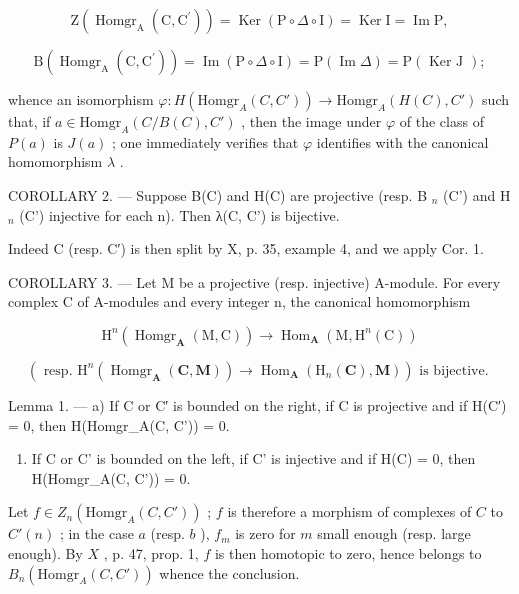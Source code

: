 \[
\mathrm{Z} \left(\operatorname{Homgr} _ {\mathrm{A}} \left(\mathrm{C}, \mathrm{C} ^ {\prime}\right)\right) = \operatorname{Ker} (\mathrm{P} \circ \Delta \circ \mathrm{I}) = \operatorname{Ker} \mathrm{I} = \operatorname{Im} \mathrm{P},
\]

\[
\mathrm{B} \left(\operatorname{Homgr} _ {\mathrm{A}} \left(\mathrm{C}, \mathrm{C} ^ {\prime}\right)\right) = \operatorname{Im} (\mathrm{P} \circ \Delta \circ \mathrm{I}) = \mathrm{P} (\operatorname{Im} \Delta) = \mathrm{P} (\text { Ker   J });
\]

whence an isomorphism \(\varphi : H(\text{Homgr}_A(C, C')) \to \text{Homgr}_A(H(C), C')\) such that, if \(a \in \text{Homgr}_A(C/B(C), C')\) , then the image under \(\varphi\) of the class of \(P(a)\) is \(J(a)\) ; one immediately verifies that \(\varphi\) identifies with the canonical homomorphism \(\lambda\) .

COROLLARY 2. --- Suppose B(C) and H(C) are projective (resp. B \(_{n}\) (C') and H \(_{n}\) (C') injective for each n). Then λ(C, C') is bijective.

Indeed C (resp. C′) is then split by X, p. 35, example 4, and we apply Cor. 1.

COROLLARY 3. --- Let M be a projective (resp. injective) A-module. For every complex C of A-modules and every integer n, the canonical homomorphism

\[
\mathrm{H} ^ {n} (\operatorname{Homgr} _ {\mathbf {A}} (\mathrm{M}, \mathrm{C})) \rightarrow \operatorname{Hom} _ {\mathbf {A}} (\mathrm{M}, \mathrm{H} ^ {n} (\mathrm{C}))
\]

\[
\left(\text { resp. } \mathrm{H} ^ {n} (\operatorname{Homgr} _ {\mathbf {A}} (\mathbf {C}, \mathbf {M})) \rightarrow \operatorname{Hom} _ {\mathbf {A}} \left(\mathrm{H} _ {n} (\mathbf {C}), \mathbf {M}\right)\right) \text { is   bijective. }
\]

Lemma 1. --- a) If C or C′ is bounded on the right, if C is projective and if H(C′) = 0, then H(Homgr\_A(C, C')) = 0.

\begin{enumerate}
\def\labelenumi{\alph{enumi})}
\setcounter{enumi}{1}
\tightlist
\item
  If C or C' is bounded on the left, if C' is injective and if H(C) = 0, then H(Homgr\_A(C, C')) = 0.
\end{enumerate}

Let \(f \in Z_n(\text{Homgr}_A(C, C'))\) ; \(f\) is therefore a morphism of complexes of \(C\) to \(C'(n)\) ; in the case \(a\) (resp. \(b\) ), \(f_m\) is zero for \(m\) small enough (resp. large enough). By \(X\) , p. 47, prop. 1, \(f\) is then homotopic to zero, hence belongs to \(B_n(\text{Homgr}_A(C, C'))\) whence the conclusion.

